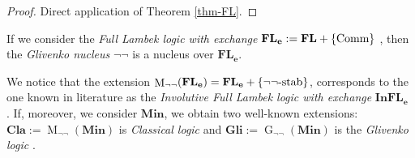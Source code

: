 \documentclass[runningheads]{llncs}
\newcommand{\FL}{\mathbf{FL}}
\newcommand{\FLe}{\mathbf{FL_e}}
\newcommand{\InFLe}{\mathbf{InFL_e}}
\newcommand{\Min}{\mathbf{Min}}
\newcommand{\Cl}{\mathbf{Cla}}
\newcommand{\Gl}{\mathbf{Gli}}
\DeclareMathOperator{\Glivenko}{G}
\DeclareMathOperator{\Maximal}{M}
\begin{document}
\begin{proof}
	Direct application of Theorem \ref{thm-FL}.
\end{proof}

If we consider the \emph{Full Lambek logic with exchange} $\FLe:=\FL+\{\textnormal{Comm}\}$ \cite[\S 2.1]{ResLat}, then the \emph{Glivenko nucleus} ${\neg\neg}$ is a nucleus over $\FLe$.

We notice that the extension 
$\Maximal_{\neg\neg}(\FLe)=\FLe+\{{\neg\neg}\textnormal{-stab}\}$,
corresponds to the one known in literature as the \emph{Involutive Full Lambek logic with exchange} $\InFLe$ \cite[\S 7.3]{ResLat}.
If, moreover, we consider $\Min$, we obtain two well-known extensions: $\Cl:=\Maximal_{\neg\neg}(\Min)$ is \emph{Classical logic} and $\Gl:=\Glivenko_{\neg\neg}(\Min)$ is the \emph{Glivenko logic} \cite{ResLat,Odintsov2008-ODICNA,Segerberg1968-SEGPLR}. 
\end{document}
